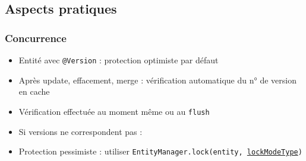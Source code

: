 \documentclass[english, french]{beamer}
\begin{document}
%		
%
%		
%
%		

\subsection{Aspects pratiques}
\begin{frame}
	\frametitle{Concurrence}
	\begin{itemize}
		\item Entité avec \texttt{@Version} : protection optimiste par défaut
		\item Après update, effacement, merge : vérification automatique du n° de version en cache
		\item Vérification effectuée au moment même ou au \texttt{flush}
		\item Si versions ne correspondent pas : 
		\item Protection pessimiste : utiliser \texttt{EntityManager.lock(entity, \href{https://docs.oracle.com/javaee/7/api/javax/persistence/LockModeType.html}{lockModeType})}
	\end{itemize}
\end{frame}
\end{document}
